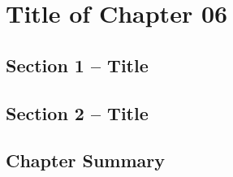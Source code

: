 \chapter{Title of Chapter 06\label{chap:control} }

\section{Section 1 -- Title}

\lipsum[1] 

\section{Section 2 -- Title\label{sec:SRScontrol} }%

\lipsum[1] 



\section{Chapter Summary} \label{sec:C6_chapsummary}

\lipsum[1] 